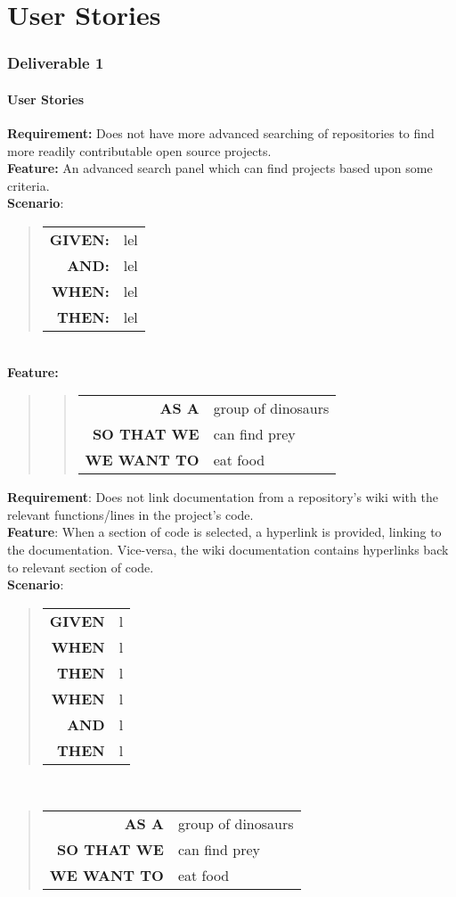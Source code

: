 \documentclass[12pt]{article}
\newcommand{\Requirement}[1] {
   \noindent \textbf{Requirement:} #1
}
\newcommand{\Feature}[1]{ 
   \noindent \textbf{Feature:} #1
}
\newcommand{\FeatureC}[4]{ 
	\begin{quote}
	\begin{tabular}{rl}
	\textbf{AS A} & #1\\
	\textbf{SO THAT \uppercase{#2}} & #3\\
	\textbf{\uppercase{#2} WANT TO} & #4  
	\end{tabular}
	\end{quote}
}
\newcommand{\GivenSc} {
	\noindent \textbf{GIVEN:}
	}
\newcommand{\WhenSc} {
	\noindent \textbf{WHEN:}
	}
\newcommand{\AndSc} {
	\noindent \textbf{AND:}
	}
\newcommand{\ThenSc} {
	\noindent \textbf{THEN:}
	}
\begin{document}


\pagebreak
\setcounter{part}{1}
\setcounter{section}{1}
\setcounter{subsection}{0}
\part{User Stories}
\section*{Deliverable 1}
\subsection{User Stories}

\begin{framed}
\Requirement{Does not have more advanced searching of repositories to find more readily contributable open source projects.}\\[0.2cm]
\Feature{An advanced search panel which can find projects based upon some criteria.}\\[0.4cm]
\noindent \textbf{Scenario}:
\begin{quote}
\begin{tabular}{rl}
\GivenSc & lel\\
\AndSc & lel\\
\WhenSc & lel\\
\ThenSc & lel
\end{tabular}
\end{quote}
~\\
\Feature{}
\begin{quote}
\FeatureC{group of dinosaurs}{we}{can find prey}{eat food}
\end{quote}
\end{framed}

\pagebreak
\begin{framed}
\noindent \textbf{Requirement}: Does not link documentation from a repository's wiki with the relevant functions/lines in the project's code.\\[0.2cm]
\noindent \textbf{Feature}: When a section of code is selected, a hyperlink is provided, linking to the documentation. Vice-versa, the wiki documentation contains hyperlinks back to relevant section of code.\\[0.4cm]
\noindent \textbf{Scenario}:
\begin{quote}
\begin{tabular}{rl}
\textbf{GIVEN} & l\\
\textbf{WHEN} & l\\
\textbf{THEN} & l\\
\textbf{WHEN} & l\\
\textbf{AND} & l\\
\textbf{THEN} & l
\end{tabular}
\end{quote}
~\\

\noindent \FeatureC{group of dinosaurs}{we}{can find prey}{eat food}
\end{framed}
\end{document}
